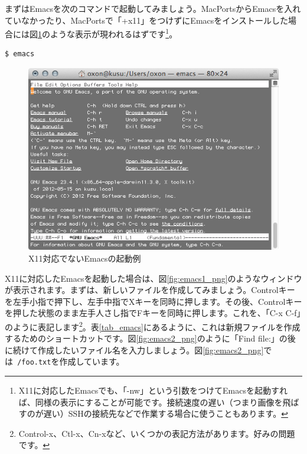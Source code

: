 まずはEmacsを次のコマンドで起動してみましょう。MacPortsからEmacsを入れていなかったり、MacPortsで「+x11」をつけずにEmacsをインストールした場合には図\ref{fig:emacs_nox11_png}のような表示が現われるはずです\footnote{X11に対応したEmacsでも、「-nw」という引数をつけてEmacsを起動すれば、同様の表示にすることが可能です。接続速度の遅い（つまり画像を飛ばすのが遅い）SSHの接続先などで作業する場合に使うこともあります。}。

\begin{lstlisting}[language=bash]
$ emacs
\end{lstlisting}

\begin{figure}
  \centering
  \includegraphics[scale=0.35]{fig/emacs_nox11.png}
  \caption{X11対応でないEmacsの起動例}
  \label{fig:emacs_nox11_png}
\end{figure}

X11に対応したEmacsを起動した場合は、図\ref{fig:emacs1_png}のようなウィンドウが表示されます。まずは、新しいファイルを作成してみましょう。Controlキーを左手小指で押下し、左手中指でXキーを同時に押します。その後、Controlキーを押した状態のまま左手人さし指でFキーを同時に押します。これを、「C-x C-f」のように表記します\footnote{Control-x、Ctl-x、Cn-xなど、いくつかの表記方法があります。好みの問題です。}。表\ref{tab_emacs}にあるように、これは新規ファイルを作成するためのショートカットです。図\ref{fig:emacs2_png}のように「Find file:」の後に続けて作成したいファイル名を入力しましょう。図\ref{fig:emacs2_png}では\texttt{~/foo.txt}を作成しています。

